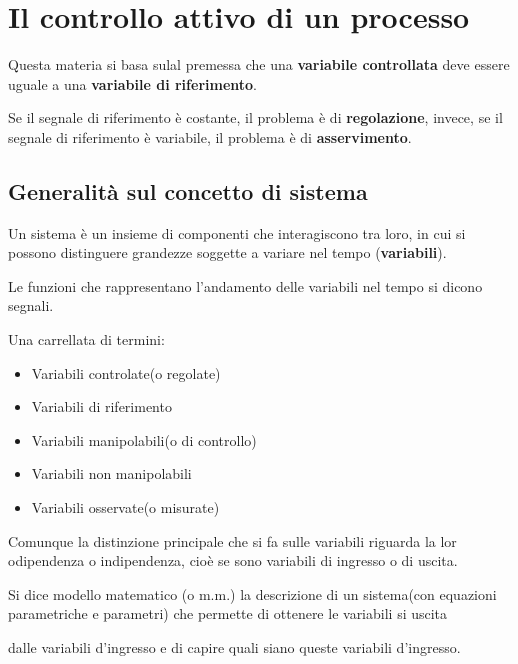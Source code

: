 

\chapter{Il controllo attivo di un processo} %
\label{chap:Il controllo attivo di un processo}

Questa materia si basa sulal premessa che una \textbf{variabile controllata} deve essere
uguale a una \textbf{variabile di riferimento}.

Se il segnale di riferimento è costante, il problema è di \textbf{regolazione}, invece, 
se il segnale di riferimento è variabile, il problema è di \textbf{asservimento}.

\section{Generalità sul concetto di sistema} %
\label{sec:Generalità sul concetto di sistema}

\begin{theorem}[Sistema]
  Un sistema è un insieme di componenti che interagiscono tra loro,
  in cui si possono distinguere grandezze soggette a variare nel tempo (\textbf{variabili}).
\end{theorem}

\begin{theorem}[Segnale]
  Le funzioni che rappresentano l'andamento delle variabili nel tempo si dicono segnali.
\end{theorem}

Una carrellata di termini:
\begin{itemize}
  \item Variabili controlate(o regolate)
  \item Variabili di riferimento
  \item Variabili manipolabili(o di controllo)
  \item Variabili non manipolabili
  \item Variabili osservate(o misurate)
\end{itemize}

Comunque la distinzione principale che si fa sulle variabili riguarda la lor odipendenza o indipendenza,
cioè se sono variabili di ingresso o di uscita.

\begin{theorem}
  Si dice modello matematico (o m.m.) la descrizione di un sistema(con equazioni parametriche e parametri) che permette di ottenere le variabili si uscita

  dalle variabili d'ingresso e di capire quali siano queste variabili d'ingresso.
\end{theorem}

